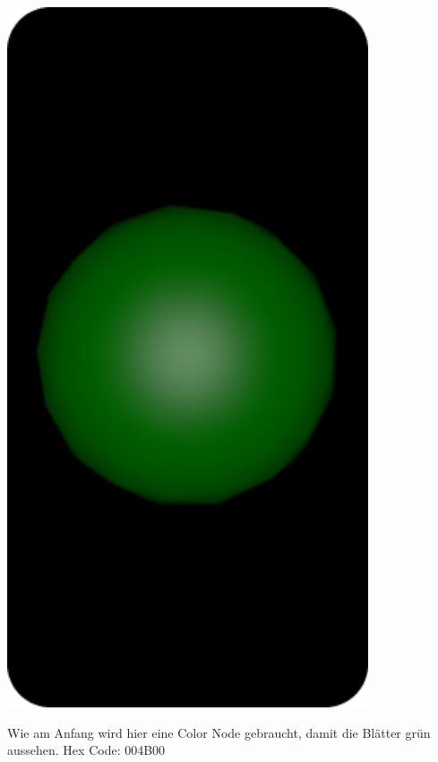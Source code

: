 \documentclass[paper=a4,fontsize=12pt,ngerman]{scrartcl}
\begin{document}
	\begin{minipage}{0.3\textwidth}
		\includegraphics[width=0.8\textwidth]{graphics/Ali7.png}
	\end{minipage}
	\begin{minipage}{0.7\textwidth}
	Wie am Anfang wird hier eine Color Node gebraucht, damit die Blätter grün aussehen. Hex Code: 004B00
	\end{minipage}
\end{document}

